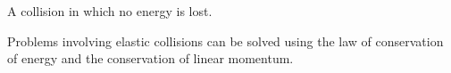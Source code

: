 A collision in which no energy is lost. 
\par
Problems involving 
elastic collisions can be solved using the law of conservation
of energy and the conservation of linear momentum.
